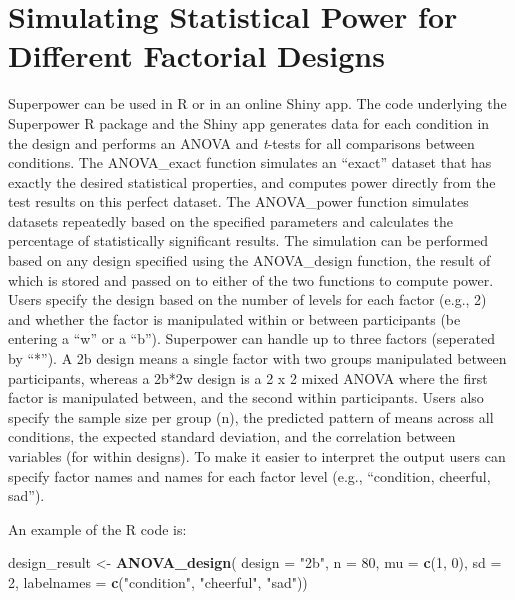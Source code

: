 \documentclass[
  ,jou,floatsintext]{apa6}
\newenvironment{Shaded}{\begin{snugshade}}{\end{snugshade}}
\newcommand{\DataTypeTok}[1]{\textcolor[rgb]{0.13,0.29,0.53}{#1}}
\newcommand{\DecValTok}[1]{\textcolor[rgb]{0.00,0.00,0.81}{#1}}
\newcommand{\KeywordTok}[1]{\textcolor[rgb]{0.13,0.29,0.53}{\textbf{#1}}}
\newcommand{\NormalTok}[1]{#1}
\newcommand{\StringTok}[1]{\textcolor[rgb]{0.31,0.60,0.02}{#1}}
\begin{document}
\hypertarget{simulating-statistical-power-for-different-factorial-designs}{%
\section{Simulating Statistical Power for Different Factorial Designs}\label{simulating-statistical-power-for-different-factorial-designs}}

Superpower can be used in R or in an online Shiny app.
The code underlying the Superpower R package and the Shiny app generates data for each condition in the design and performs an ANOVA and \emph{t}-tests for all comparisons between conditions.
The ANOVA\_exact function simulates an \enquote{exact} dataset that has exactly the desired statistical properties, and computes power directly from the test results on this perfect dataset.
The ANOVA\_power function simulates datasets repeatedly based on the specified parameters and calculates the percentage of statistically significant results.
The simulation can be performed based on any design specified using the ANOVA\_design function, the result of which is stored and passed on to either of the two functions to compute power.
Users specify the design based on the number of levels for each factor (e.g., 2) and whether the factor is manipulated within or between participants (be entering a \enquote{w} or a \enquote{b}).
Superpower can handle up to three factors (seperated by \enquote{*}).
A 2b design means a single factor with two groups manipulated between participants, whereas a 2b*2w design is a 2 x 2 mixed ANOVA where the first factor is manipulated between, and the second within participants.
Users also specify the sample size per group (n), the predicted pattern of means across all conditions, the expected standard deviation, and the correlation between variables (for within designs).
To make it easier to interpret the output users can specify factor names and names for each factor level (e.g., \enquote{condition, cheerful, sad}).

An example of the R code is:

\begin{Shaded}
\begin{Highlighting}[]
\NormalTok{design_result <-}\StringTok{ }\KeywordTok{ANOVA_design}\NormalTok{(}
  \DataTypeTok{design =} \StringTok{"2b"}\NormalTok{, }\DataTypeTok{n =} \DecValTok{80}\NormalTok{, }\DataTypeTok{mu =} \KeywordTok{c}\NormalTok{(}\DecValTok{1}\NormalTok{, }\DecValTok{0}\NormalTok{), }
  \DataTypeTok{sd =} \DecValTok{2}\NormalTok{,}
  \DataTypeTok{labelnames =} \KeywordTok{c}\NormalTok{(}\StringTok{"condition"}\NormalTok{, }
                 \StringTok{"cheerful"}\NormalTok{, }\StringTok{"sad"}\NormalTok{))}
\end{Highlighting}
\end{Shaded}
\end{document}
